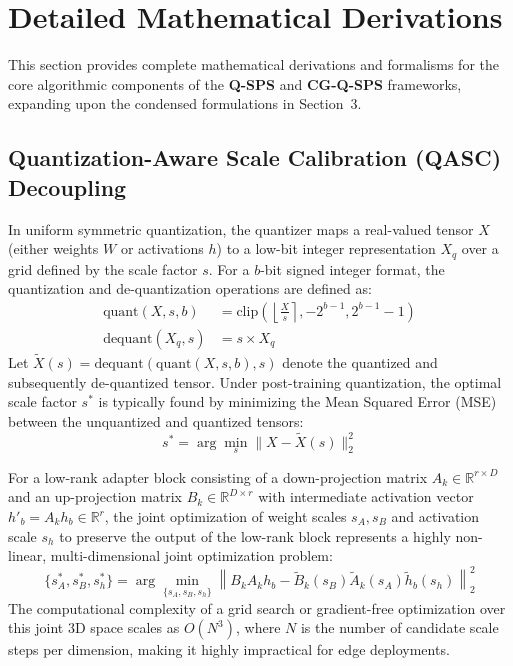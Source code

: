 \section{Detailed Mathematical Derivations}
\label{sec:appendix_math}

This section provides complete mathematical derivations and formalisms for the core algorithmic components of the \textbf{Q-SPS} and \textbf{CG-Q-SPS} frameworks, expanding upon the condensed formulations in Section~3.

\subsection{Quantization-Aware Scale Calibration (QASC) Decoupling}
\label{sec:appendix_qasc}

In uniform symmetric quantization, the quantizer maps a real-valued tensor $X$ (either weights $W$ or activations $h$) to a low-bit integer representation $X_q$ over a grid defined by the scale factor $s$. For a $b$-bit signed integer format, the quantization and de-quantization operations are defined as:
\begin{align}
    \text{quant}(X, s, b) &= \text{clip}\left(\left\lfloor \frac{X}{s} \right\rceil, -2^{b-1}, 2^{b-1}-1\right) \\
    \text{dequant}(X_q, s) &= s \times X_q
\end{align}
Let $\tilde{X}(s) = \text{dequant}(\text{quant}(X, s, b), s)$ denote the quantized and subsequently de-quantized tensor. Under post-training quantization, the optimal scale factor $s^*$ is typically found by minimizing the Mean Squared Error (MSE) between the unquantized and quantized tensors:
\begin{equation}
    s^* = \arg\min_{s} \| X - \tilde{X}(s) \|_2^2
\end{equation}

For a low-rank adapter block consisting of a down-projection matrix $A_k \in \mathbb{R}^{r \times D}$ and an up-projection matrix $B_k \in \mathbb{R}^{D \times r}$ with intermediate activation vector $h'_b = A_k h_b \in \mathbb{R}^{r}$, the joint optimization of weight scales $s_A, s_B$ and activation scale $s_h$ to preserve the output of the low-rank block represents a highly non-linear, multi-dimensional joint optimization problem:
\begin{equation}
    \{s_A^*, s_B^*, s_h^*\} = \arg\min_{\{s_A, s_B, s_h\}} \left\| B_k A_k h_b - \tilde{B}_k(s_B) \tilde{A}_k(s_A) \tilde{h}_b(s_h) \right\|_2^2
\end{equation}
The computational complexity of a grid search or gradient-free optimization over this joint 3D space scales as $O(N^3)$, where $N$ is the number of candidate scale steps per dimension, making it highly impractical for edge deployments.

